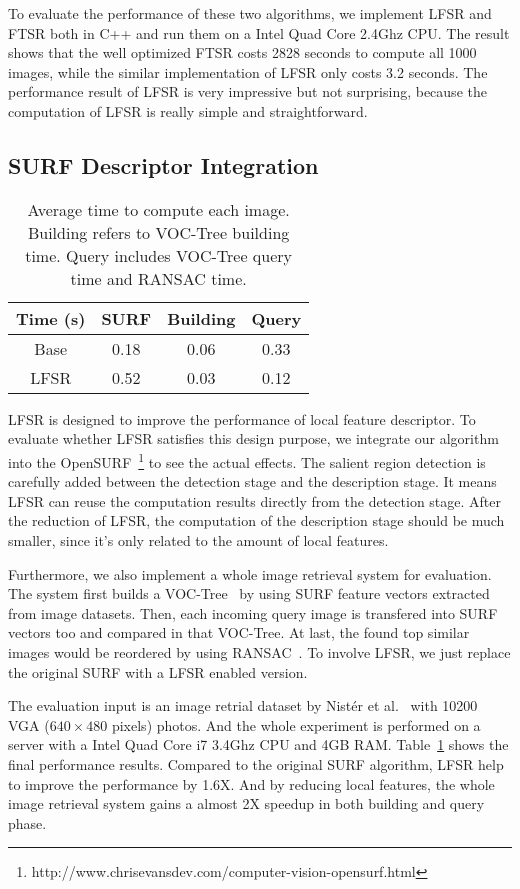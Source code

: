 To evaluate the performance of these two algorithms, we implement LFSR and FTSR both in C++ and run them on a Intel Quad Core 2.4Ghz CPU. The result shows that the well optimized FTSR costs 2828 seconds to compute all 1000 images, while the similar implementation of LFSR only costs 3.2 seconds. The performance result of LFSR is very impressive but not surprising, because the computation of LFSR is really simple and straightforward.

\subsection{SURF Descriptor Integration}
\label{sec:evaluation_integration}

\begin{table}
\begin{center}
\begin{tabular}{|c|c|c|c|}
\hline
Time (s) & SURF & Building & Query \\
\hline\hline
Base & 0.18 & 0.06 & 0.33 \\
LFSR & 0.52 & 0.03 & 0.12 \\
\hline
\end{tabular}
\end{center}
\caption{Average time to compute each image. Building refers to VOC-Tree building time. Query includes VOC-Tree query time and RANSAC time.}
\label{tab:integration}
\end{table}

LFSR is designed to improve the performance of local feature descriptor. To evaluate whether LFSR satisfies this design purpose, we integrate our algorithm into the OpenSURF~\footnote{http://www.chrisevansdev.com/computer-vision-opensurf.html} to see the actual effects. The salient region detection is carefully added between the detection stage and the description stage. It means LFSR can reuse the computation results directly from the detection stage. After the reduction of LFSR, the computation of the description stage should be much smaller, since it's only related to the amount of local features.

Furthermore, we also implement a whole image retrieval system for evaluation. The system first builds a VOC-Tree~\cite{VOCTree2006} by using SURF feature vectors extracted from image datasets. Then, each incoming query image is transfered into SURF vectors too and compared in that VOC-Tree. At last, the found top similar images would be reordered by using RANSAC~\cite{ransac1981}. To involve LFSR, we just replace the original SURF with a LFSR enabled version.

The evaluation input is an image retrial dataset by Nist\'er et al.~\cite{nister-stewenius-cvpr-2006} with 10200 VGA ($640\times480$ pixels) photos. And the whole experiment is performed on a server with a Intel Quad Core i7 3.4Ghz CPU and 4GB RAM. Table~\ref{tab:integration} shows the final performance results. Compared to the original SURF algorithm, LFSR help to improve the performance by 1.6X. And by reducing local features, the whole image retrieval system gains a almost 2X speedup in both building and query phase.